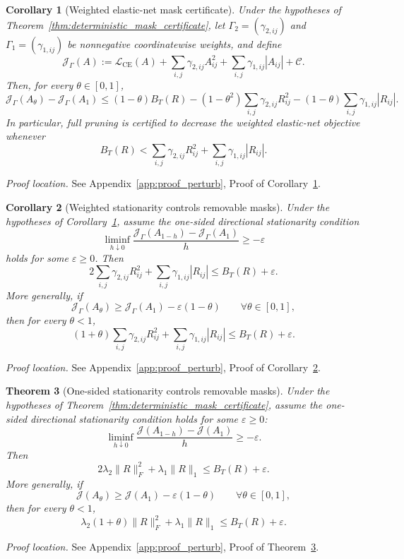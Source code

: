 \documentclass[11pt]{article}
\theoremstyle{plain}
\newtheorem{thm}{Theorem}[section]
\newtheorem{cor}[thm]{Corollary}
\theoremstyle{definition}
\theoremstyle{remark}
\newcommand{\1}{\mathbf{1}}
\newcommand{\proofloc}[1]{\par\noindent\emph{Proof location.} #1\par}
\begin{document}
\begin{cor}[Weighted elastic-net mask certificate]
\label{cor:weighted_mask_certificate}
Under the hypotheses of Theorem~\ref{thm:deterministic_mask_certificate}, let \(\Gamma_2=(\gamma_{2,ij})\) and \(\Gamma_1=(\gamma_{1,ij})\) be nonnegative coordinatewise weights, and define
\[
\mathcal J_{\Gamma}(A):=
\mathcal L_{\mathrm{CE}}(A)
+
\sum_{i,j}\gamma_{2,ij}A_{ij}^2
+
\sum_{i,j}\gamma_{1,ij}|A_{ij}|
+
\mathcal C.
\]
Then, for every \(\theta\in[0,1]\),
\[
\mathcal J_{\Gamma}(A_\theta)-\mathcal J_{\Gamma}(A_1)
\le
(1-\theta)B_T(R)
-
(1-\theta^2)\sum_{i,j}\gamma_{2,ij}R_{ij}^2
-
(1-\theta)\sum_{i,j}\gamma_{1,ij}|R_{ij}|.
\]
In particular, full pruning is certified to decrease the weighted elastic-net objective whenever
\[
B_T(R)
<
\sum_{i,j}\gamma_{2,ij}R_{ij}^2
+
\sum_{i,j}\gamma_{1,ij}|R_{ij}|.
\]
\end{cor}
\proofloc{See Appendix~\ref{app:proof_perturb}, Proof of Corollary~\ref{cor:weighted_mask_certificate}.}

\begin{cor}[Weighted stationarity controls removable masks]
\label{cor:weighted_mask_stationarity}
Under the hypotheses of Corollary~\ref{cor:weighted_mask_certificate}, assume the one-sided directional stationarity condition
\[
\liminf_{h\downarrow0}
\frac{\mathcal J_{\Gamma}(A_{1-h})-\mathcal J_{\Gamma}(A_1)}{h}
\ge
-\varepsilon
\]
holds for some \(\varepsilon\ge0\). Then
\[
2\sum_{i,j}\gamma_{2,ij}R_{ij}^2
+
\sum_{i,j}\gamma_{1,ij}|R_{ij}|
\le
B_T(R)+\varepsilon.
\]
More generally, if
\[
\mathcal J_{\Gamma}(A_\theta)\ge \mathcal J_{\Gamma}(A_1)-\varepsilon(1-\theta)
\qquad\forall\theta\in[0,1],
\]
then for every \(\theta<1\),
\[
(1+\theta)\sum_{i,j}\gamma_{2,ij}R_{ij}^2
+
\sum_{i,j}\gamma_{1,ij}|R_{ij}|
\le
B_T(R)+\varepsilon.
\]
\end{cor}
\proofloc{See Appendix~\ref{app:proof_perturb}, Proof of Corollary~\ref{cor:weighted_mask_stationarity}.}

\begin{thm}[One-sided stationarity controls removable masks]
\label{thm:deterministic_mask_stationarity}
Under the hypotheses of Theorem~\ref{thm:deterministic_mask_certificate}, assume the one-sided directional stationarity condition holds for some \(\varepsilon\ge0\):
\[
\liminf_{h\downarrow0}
\frac{\mathcal J(A_{1-h})-\mathcal J(A_1)}{h}
\ge
-\varepsilon.
\]
Then
\[
2\lambda_2\|R\|_F^2+\lambda_1\|R\|_1
\le
B_T(R)+\varepsilon.
\]
More generally, if
\[
\mathcal J(A_\theta)\ge \mathcal J(A_1)-\varepsilon(1-\theta)
\qquad\forall\theta\in[0,1],
\]
then for every \(\theta<1\),
\[
\lambda_2(1+\theta)\|R\|_F^2+\lambda_1\|R\|_1
\le
B_T(R)+\varepsilon.
\]
\end{thm}
\proofloc{See Appendix~\ref{app:proof_perturb}, Proof of Theorem~\ref{thm:deterministic_mask_stationarity}.}
\end{document}
